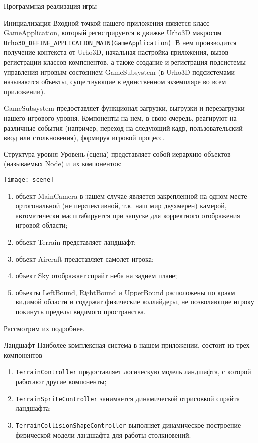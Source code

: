 	\begin{section}{Программная реализация игры}

		\begin{subsection}{Инициализация}
			Входной точкой нашего приложения является класс GameApplication, который регистрируется в движке Urho3D макросом \verb|Urho3D_DEFINE_APPLICATION_MAIN(GameApplication)|.
			В нем производится получение контекста от Urho3D, начальная настройка приложения, вызов регистрации классов компонентов, а также создание и регистрация подсистемы управления игровым состоянием GameSubsystem (в Urho3D подсистемами называются объекты, существующие в единственном экземпляре во всем приложении).

			GameSubsystem предоставляет функционал загрузки, выгрузки и перезагрузки нашего игрового уровня.
			Компоненты на нем, в свою очередь, реагируют на различные события (например, переход на следующий кадр, пользовательский ввод или столкновения), формируя игровой процесс.
		\end{subsection}

		\begin{subsection}{Структура уровня}
			Уровень (сцена) представляет собой иерархию объектов (называемых Node) и их компонентов:

			\texttt{[image: scene]}

			\begin{enumerate}
				\item объект MainCamera в нашем случае является закрепленной на одном месте ортогональной (не перспективной, т.к. наш мир двухмерен) камерой, автоматически масштабируется при запуске для корректного отображения игровой области;
				\item объект Terrain представляет ландшафт;
				\item объект Aircraft представляет самолет игрока;
				\item объект Sky отображает спрайт неба на заднем плане;
				\item объекты LeftBound, RightBound и UpperBound расположены по краям видимой области и содержат физические коллайдеры, не позволяющие игроку покинуть пределы видимого пространства.
			\end{enumerate}

			Рассмотрим их подробнее.
		\end{subsection}

		\begin{subsection}{Ландшафт}
			Наиболее комплексная система в нашем приложении, состоит из трех компонентов
			\begin{enumerate}
				\item \verb|TerrainController| предоставляет логическую модель ландшафта, с которой работают другие компоненты;
				\item \verb|TerrainSpriteController| занимается динамической отрисовкой спрайта ландшафта;
				\item \verb|TerrainCollisionShapeController| выполняет динамическое построение физической модели ландшафта для работы столкновений.
			\end{enumerate}


\end{subsection}
\end{section}
